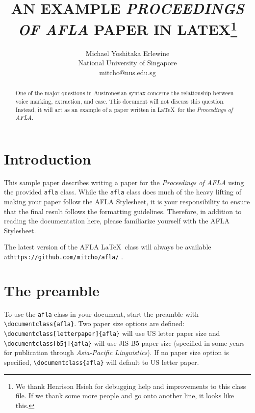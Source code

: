 \documentclass{afla}
\begin{document}
\title{\MakeUppercase{An example \textit{Proceedings of AFLA} paper in LaTeX}\thanks{We thank Henrison Hsieh for debugging help and improvements to this class file. If we thank some more people and go onto another line, it looks like this.}}

\author{Michael Yoshitaka Erlewine\\
	National University of Singapore\\
	mitcho@nus.edu.sg}


\maketitle

\begin{abstract}
One of the major questions in Austronesian syntax concerns the relationship between voice marking, extraction, and case. This document will not discuss this question. Instead, it will act as an example of a paper written in \LaTeX\ for the \textit{Proceedings of AFLA}.
\end{abstract}

\section{Introduction}

This sample paper describes writing a paper for the \textit{Proceedings of AFLA} using the provided \verb`afla` class. While the \verb`afla` class does much of the heavy lifting of making your paper follow the AFLA Stylesheet, it is your responsibility to ensure that the final result follows the formatting guidelines. Therefore, in addition to reading the documentation here, please familiarize yourself with the AFLA Stylesheet.

The latest version of the AFLA \LaTeX\ class will always be available at\linebreak \verb`https://github.com/mitcho/afla/` .

\section{The preamble}

To use the \verb`afla` class in your document, start the preamble with \verb`\documentclass{afla}`. Two paper size options are defined: \verb`\documentclass[letterpaper]{afla}` will use US letter paper size and \verb`\documentclass[b5j]{afla}` will use JIS B5 paper size (specified in some years for publication through \textit{Asia-Pacific Linguistics}). If no paper size option is specified, \verb`\documentclass{afla}` will default to US letter paper.
\end{document}
